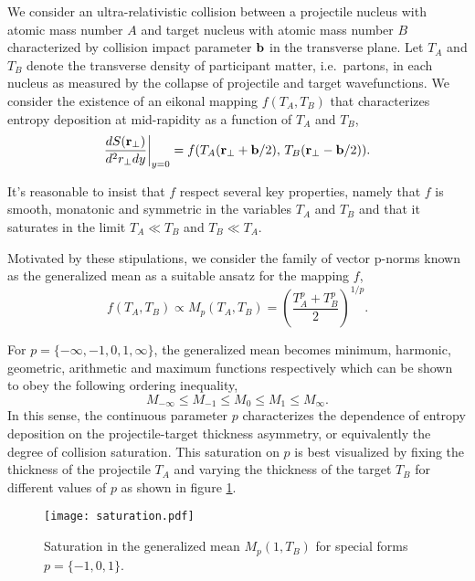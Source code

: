 \documentclass[aps,prl,reprint,amsmath,nofootinbib]{revtex4-1}
\begin{document}
We consider an ultra-relativistic collision between a projectile nucleus with atomic mass number $A$ and target nucleus with atomic mass number $B$ characterized 
by collision impact parameter ${\bf b}$ in the transverse plane. Let $T_A$ and $T_B$ denote the transverse density of participant matter, i.e.\ partons, 
in each nucleus as measured by the collapse of projectile and target wavefunctions. We consider the existence of an eikonal mapping $f(T_A,T_B)$ that 
characterizes entropy deposition at mid-rapidity as a function of $T_A$ and $T_B$,
\begin{equation}
  \label{ansatz}
  \frac{dS({\bf r}_\perp)}{d^2r_\perp dy} \biggr \rvert_{y=0}  = f(T_A({\bf r}_\perp + {\bf b}/2),\,T_B({\bf r}_\perp - {\bf b}/2)).
\end{equation}

It's reasonable to insist that $f$ respect several key properties, namely that $f$ is smooth, monatonic and symmetric in 
the variables $T_A$ and $T_B$ and that it saturates in the limit $T_A \ll T_B$ and $T_B \ll T_A$.

Motivated by these stipulations, we consider the family of vector p-norms known as the generalized mean as a suitable ansatz for the mapping $f$,
\begin{equation}
 \label{generalized mean ansatz}
 f(T_A, T_B) \propto M_p(T_A,T_B) = \left( \frac{T_A^p + T_B^p}{2} \right)^{1/p}.
\end{equation}

For $p = \{-\infty,-1,0,1,\infty\}$, the generalized mean becomes minimum, harmonic, geometric, arithmetic and maximum functions respectively which can be shown
to obey the following ordering inequality, 
\begin{equation}
 M_{-\infty} \le M_{-1} \le M_{0} \le M_{1} \le M_{\infty}.
\end{equation}
In this sense, the continuous parameter $p$ characterizes the dependence of entropy deposition on the projectile-target thickness asymmetry, or equivalently the 
degree of collision saturation. This saturation on $p$ is best visualized by fixing the thickness of the projectile $T_A$ and varying the thickness of the target 
$T_B$ for different values of $p$ as shown in figure \ref{saturation}.
\begin{figure}[b]
 \texttt{[image: saturation.pdf]}
 \caption{\label{saturation} Saturation in the generalized mean $M_p(1,T_B)$ for special forms $p=\{-1, 0, 1\}$.}
\end{figure}
\end{document}
